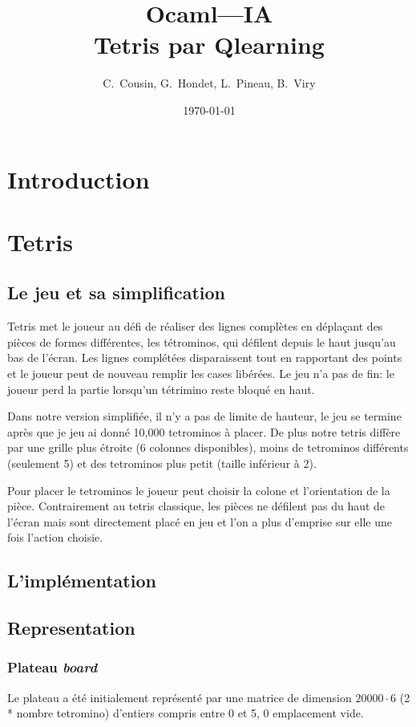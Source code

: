 \documentclass{article}
\title{Ocaml---IA\\Tetris par Qlearning}
\author{C.~Cousin, G.~Hondet, L.~Pineau, B.~Viry}
\date{\today}
\begin{document}
\maketitle
\tableofcontents


\section*{Introduction}

\section{Tetris}

\subsection{Le jeu et sa simplification}
Tetris met le joueur au défi de réaliser des lignes complètes en déplaçant des
pièces de formes différentes, les tétrominos, qui défilent depuis le haut
jusqu'au bas de l'écran. Les lignes complétées disparaissent tout en rapportant
des points et le joueur peut de nouveau remplir les cases libérées. Le jeu
n'a pas de fin: le joueur perd la partie lorsqu'un tétrimino reste bloqué en
haut.

Dans notre version simplifiée, il n'y a pas de limite de hauteur, le jeu se
termine après que je jeu ai donné 10,000 tetrominos à placer. De plus notre
tetris diffère par une grille plus étroite (6 colonnes disponibles), moins de
tetrominos différents (seulement 5) et des tetrominos plus petit (taille
inférieur à 2).

Pour placer le tetrominos le joueur peut choisir la colone et l'orientation de
la pièce. Contrairement au tetris classique, les pièces ne défilent pas du haut
de l'écran mais sont directement placé en jeu et l'on a plus d'emprise sur elle
une fois l'action choisie.

\subsection{L'impl\'ementation}

\subsection{Representation}

\subsubsection{Plateau \textit{board}}
Le plateau a été initialement représenté par une matrice de dimension
\(20000\cdot 6\) (2 * nombre tetromino) d'entiers compris entre 0 et 5, 0
emplacement vide.
\end{document}
